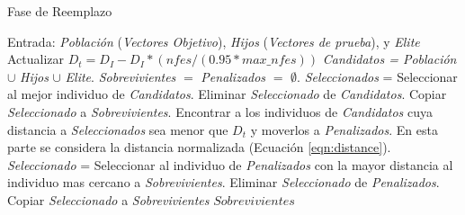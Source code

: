 \begin{algorithm}[t]
  \scriptsize
	\caption{Fase de Reemplazo} \label{alg:Replacement}
	\begin{algorithmic}[1]
	\STATE Entrada: \textit{Población} (\textit{Vectores Objetivo}), \textit{Hijos} (\textit{Vectores de prueba}), y \textit{Elite}
	\STATE Actualizar $D_t = D_I - D_I *(nfes/(0.95*max\_nfes)) $ 
	\STATE \textit{Candidatos = Población} $\cup$ \textit{Hijos} $\cup$ \textit{Elite}.
	\STATE \textit{Sobrevivientes} $=$ \textit{Penalizados} $=$ $\emptyset$.
	   \STATE \textit{Seleccionados} = Seleccionar al mejor individuo de \textit{Candidatos}.
		 \STATE Eliminar \textit{Seleccionado} de \textit{Candidatos}.
	   \STATE Copiar \textit{Seleccionado} a \textit{Sobrevivientes}.
	   \STATE Encontrar a los individuos de \textit{Candidatos} cuya distancia a \textit{Seleccionados} sea menor que $D_t$ y moverlos a \textit{Penalizados}. En esta parte se considera la distancia normalizada (Ecuación \ref{eqn:distance}).
	\ENDWHILE
	   \STATE \textit{Seleccionado} = Seleccionar al individuo de \textit{Penalizados} con la mayor distancia al individuo mas cercano a \textit{Sobrevivientes}.
		 \STATE Eliminar \textit{Seleccionado} de \textit{Penalizados}.
	   \STATE Copiar \textit{Seleccionado} a \textit{Sobrevivientes}
	\ENDWHILE
  \RETURN $Sobrevivientes$
\end{algorithmic}
\end{algorithm}

